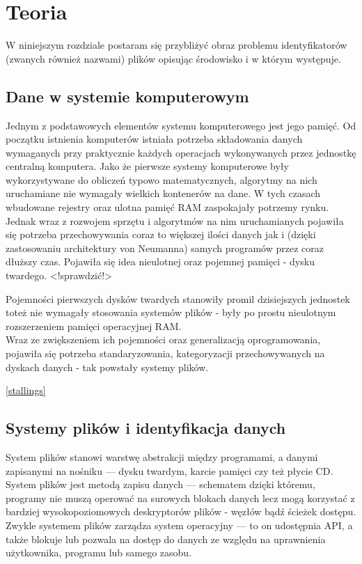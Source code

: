 \chapter{Teoria}
\par
W niniejszym rozdziale postaram się przybliżyć obraz problemu identyfikatorów (zwanych również nazwami) plików opisując środowisko i w którym występuje.

\section{Dane w systemie komputerowym}
\par
Jednym z podstawowych elementów systemu komputerowego jest jego pamięć. Od początku istnienia komputerów istniała potrzeba składowania danych wymaganych przy praktycznie każdych operacjach wykonywanych przez jednostkę centralną komputera. Jako że pierwsze systemy komputerowe były wykorzystywane do obliczeń typowo matematycznych, algorytmy na nich uruchamiane nie wymagały wielkich kontenerów na dane. W tych czasach wbudowane rejestry oraz ulotna pamięć RAM zaspokajały potrzemy rynku. Jednak wraz z rozwojem sprzętu i algorytmów na nim uruchamianych pojawiła się potrzeba przechowywania coraz to większej ilości danych jak i (dzięki zastosowaniu architektury von Neumanna) samych programów przez coraz dłuższy czas. Pojawiła się idea nieulotnej oraz pojemnej pamięci - dysku twardego. <!sprawdzić!>

\par
Pojemności pierwszych dysków twardych stanowiły promil dzisiejszych jednostek toteż nie wymagały stosowania systemów plików - były po prostu nieulotnym rozszerzeniem pamięci operacyjnej RAM.\\
Wraz ze zwiększeniem ich pojemności oraz generalizacją oprogramowania, pojawiła się potrzeba standaryzowania, kategoryzacji przechowywanych na dyskach danych - tak powstały systemy plików.

\ref{stallings}

\section{Systemy plików i identyfikacja danych}
\par
System plików stanowi warstwę abstrakcji między programami, a danymi zapisanymi na nośniku --- dysku twardym, karcie pamięci czy też płycie CD. System plików jest metodą zapisu danych --- schematem dzięki któremu, programy nie muszą operować na surowych blokach danych lecz mogą korzystać z bardziej wysokopoziomowych deskryptorów plików - węzłów bądź ścieżek dostępu.\\
Zwykle systemem plików zarządza system operacyjny --- to on udostępnia API, a także blokuje lub pozwala na dostęp do danych ze względu na uprawnienia użytkownika, programu lub samego zasobu.\\

